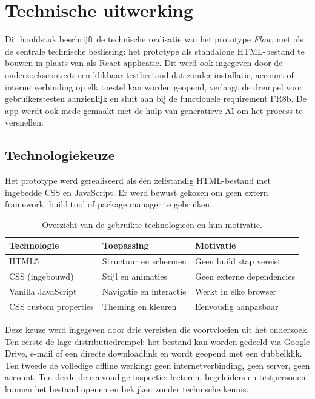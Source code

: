 
\chapter{Technische uitwerking}%
\label{ch:implementatie}

Dit hoofdstuk beschrijft de technische realisatie van het prototype \textit{Flow}, met als
de centrale technische beslissing: het prototype als standalone HTML-bestand te
bouwen in plaats van als React-applicatie. Dit werd ook ingegeven door de
onderzoekscontext: een klikbaar testbestand dat zonder installatie, account of
internetverbinding op elk toestel kan worden geopend, verlaagt de drempel voor
gebruikerstesten aanzienlijk en sluit aan bij de functionele requirement FR8b. De app werdt ook mede gemaakt met de hulp van generatieve AI om het process te versnellen.

\section{Technologiekeuze}

Het prototype werd gerealiseerd als één zelfstandig HTML-bestand met ingebedde
CSS en JavaScript. Er werd bewust gekozen om geen extern framework, build tool
of package manager te gebruiken.

\begin{table}[h]
\centering
\begin{tabular}{lll}
\hline
\textbf{Technologie} & \textbf{Toepassing} & \textbf{Motivatie} \\
\hline
HTML5               & Structuur en schermen   & Geen build stap vereist \\
CSS (ingebouwd)     & Stijl en animaties      & Geen externe dependencies \\
Vanilla JavaScript  & Navigatie en interactie & Werkt in elke browser \\
CSS custom properties & Theming en kleuren    & Eenvoudig aanpasbaar \\
\hline
\end{tabular}
\caption[Technologiestack van het prototype]{Overzicht van de gebruikte
technologieën en hun motivatie.}
\label{tab:techstack}
\end{table}

Deze keuze werd ingegeven door drie vereisten die voortvloeien uit het onderzoek.
Ten eerste de lage distributiedrempel: het bestand kan worden gedeeld via Google
Drive, e-mail of een directe downloadlink en wordt geopend met een dubbelklik.
Ten tweede de volledige offline werking: geen internetverbinding, geen server,
geen account. Ten derde de eenvoudige inspectie: lectoren, begeleiders en
testpersonen kunnen het bestand openen en bekijken zonder technische kennis.

